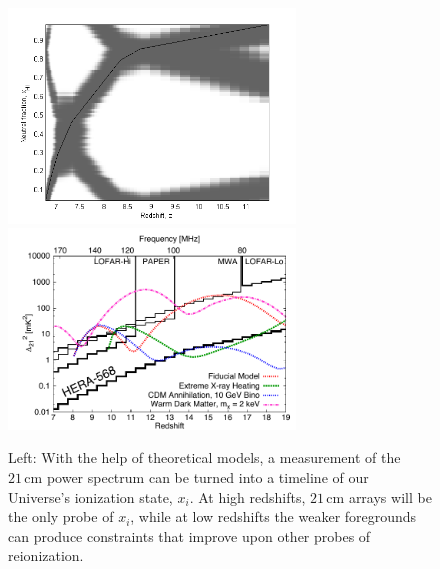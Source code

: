 \documentclass[preprint]{aastex}
\begin{document}

\begin{figure}[!ht]\centering
\includegraphics[width=3in]{plots/constraints.png}
~ %
\includegraphics[width=3in]{plots/Xray.pdf}
\caption{\small
Left: With the help of theoretical models, a measurement of the $21\,\textrm{cm}$ power spectrum
can be turned into a timeline of our Universe's ionization state, $x_i$.  At high redshifts, 
$21\,\textrm{cm}$ arrays will be the only probe of $x_i$, while at low redshifts the weaker
foregrounds can produce constraints that improve upon other probes of reionization.
}
\end{figure}
\end{document}
